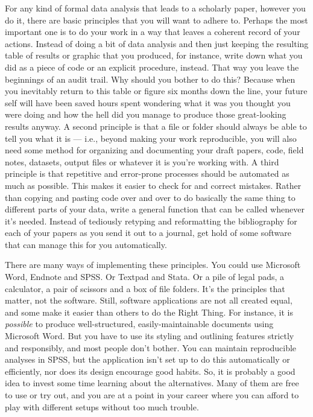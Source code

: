\documentclass[11pt,article,oneside]{memoir}
\begin{document}
For any kind of formal data analysis that leads to a scholarly paper, however you do it, there are basic principles that you will want to adhere to. Perhaps the most important one is to do your work in a way that leaves a coherent record of your actions. Instead of doing a bit of data analysis and then just keeping the resulting table of results or graphic that you produced, for instance, write down what you did as a piece of code or an explicit procedure, instead. That way you leave the beginnings of an audit trail. Why should you bother to do this? Because when you inevitably return to this table or figure six months down the line, your future self will have been saved hours spent wondering what it was you thought you were doing and how the hell did you manage to produce those great-looking results anyway. A second principle is that a file or folder should always be able to tell you what it is --- i.e., beyond making your work reproducible, you will also need some method for organizing and documenting your draft papers, code, field notes, datasets, output files or whatever it is you're working with. A third principle is that repetitive and error-prone processes should be automated as much as possible. This makes it easier to check for and correct mistakes. Rather than copying and pasting code over and over to do basically the same thing to different parts of your data, write a general function that can be called whenever it's needed. Instead of tediously retyping and reformatting the bibliography for each of your papers as you send it out to a journal, get hold of some software that can manage this for you automatically.

There are many ways of implementing these principles. You could use Microsoft Word, Endnote and SPSS. Or Textpad and Stata. Or a pile of legal pads, a calculator, a pair of scissors and a box of file folders. It's the principles that matter, not the software. Still, software applications are not all created equal, and some make it easier than others to do the Right Thing. For instance, it is \emph{possible} to produce well-structured, easily-maintainable documents using Microsoft Word. But you have to use its styling and outlining features strictly and responsibly, and most people don't bother. You can maintain reproducible analyses in SPSS, but the application isn't set up to do this automatically or efficiently, nor does its design encourage good habits. So, it is probably a good idea to invest some time learning about the alternatives. Many of them are free to use or try out, and you are at a point in your career where you can afford to play with different setups without too much trouble.
\end{document}
